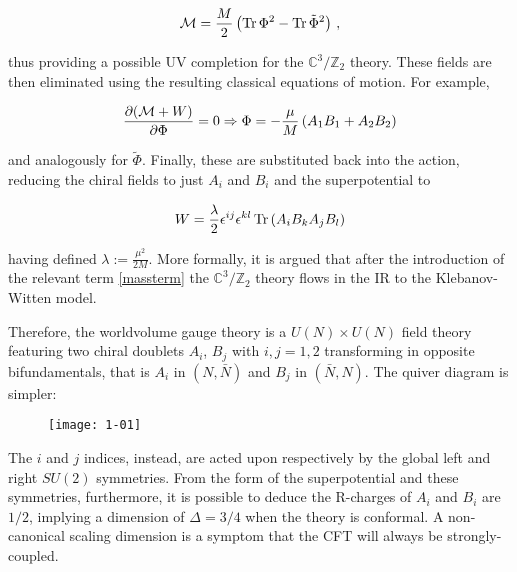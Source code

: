 \begin{equation}
	\mathcal{M} = \frac{M}{2} \left( \operatorname{Tr} \Phi^2 - \operatorname{Tr} \tilde\Phi^2 \right)\,,
	\label{massterm}
\end{equation}

thus providing a possible UV completion for the $\mathbb{C}^3/\mathbb{Z}_2$ theory. These fields are then eliminated using the resulting classical equations of motion. For example,

\begin{equation}
	\frac{\partial(\mathcal{M} + W)}{\partial\Phi} = 0 \Rightarrow \Phi = - \frac{\mu}{M} \left( A_1 B_1 + A_2 B_2 \right)
	\label{}
\end{equation}

and analogously for $\tilde \Phi$. Finally, these are substituted back into the action, reducing the chiral fields to just $A_i$ and $B_i$ and the superpotential to

\begin{equation}
	W = \frac{\lambda}{2} \epsilon^{ij} \epsilon^{kl} \operatorname{Tr} \left( A_i B_k A_j B_l \right)
	\label{kwpotential}
\end{equation}

having defined $\lambda := \frac{\mu^2}{2M}$. More formally, it is argued that after the introduction of the relevant term \eqref{massterm} the $\mathbb{C}^3/\mathbb{Z}_2$ theory flows in the IR to the Klebanov-Witten model.

Therefore, the worldvolume gauge theory is a $U(N)\times U(N)$ field theory featuring two chiral doublets $A_i$, $B_j$ with $i,j = 1,2$ transforming in opposite bifundamentals, that is $A_i$ in $(N,\bar N)$ and $B_j$ in $(\bar N, N)$. The quiver diagram is simpler:

\begin{figure}[H]
	\centering
	\texttt{[image: 1-01]}
\end{figure}

The $i$ and $j$ indices, instead, are acted upon respectively by the global left and right $SU(2)$ symmetries. From the form of the superpotential and these symmetries, furthermore, it is possible to deduce the R-charges of $A_i$ and $B_i$ are $1/2$, implying a dimension of $\Delta = 3/4$ when the theory is conformal. A non-canonical scaling dimension is a symptom that the CFT will always be strongly-coupled.

